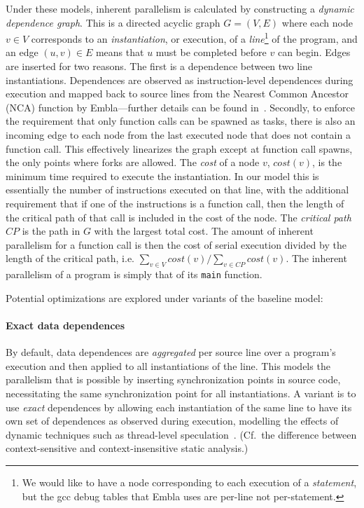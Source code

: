 Under these models, inherent parallelism is calculated by constructing a \emph{dynamic dependence graph}.
This is a directed acyclic graph $G=(V,E)$ where each node $v\in V$ corresponds to an \emph{instantiation},
or execution, of a \emph{line}\footnote{We would like to have a node corresponding to each execution of a \emph{statement}, but the gcc debug tables that Embla uses are per-line not per-statement.} of the program,
and an edge $(u,v)\in E$ means that $u$ must be completed before $v$ can begin.
Edges are inserted for two reasons.
The first is a dependence between two line instantiations.
Dependences are observed as instruction-level dependences during execution and mapped back to source lines from the Nearest Common Ancestor (NCA) function by Embla---further
details can be found in~\cite{embla:08}.
Secondly, to enforce the requirement that only function calls can be spawned as tasks,
there is also an incoming edge to each node from the last executed node that does not contain a function call.
This effectively linearizes the graph except at function call spawns, the only points where forks are allowed.
The \emph{cost} of a node $v$, $\mathit{cost}(v)$,
is the minimum time required to execute the instantiation.
In our model this is essentially the number of instructions executed on that line,
with the additional requirement that if one of the instructions is a function call,
then the length of the critical path of that call is included in the cost of the node.
The \emph{critical path} $\mathit{CP}$ is the path in $G$ with the largest total cost.
The amount of inherent parallelism for a function call is then the cost of serial execution divided by the length of the critical path,
i.e. $\sum_{v\in V} \mathit{cost}(v)/\sum_{v\in \mathit{CP}} \mathit{cost}(v)$.
The inherent parallelism of a program is simply that of its \texttt{main} function.

Potential optimizations are explored under variants of the baseline model:

\paragraph*{Exact data dependences}
By default, data dependences are \emph{aggregated} per source line over a program's execution
and then applied to all instantiations of the line.
This models the parallelism that is possible by inserting synchronization points in source code,
necessitating the same synchronization point for all instantiations.
A variant is to use \emph{exact} dependences by allowing each instantiation of the same line to have its own set of dependences as observed during execution,
modelling the effects of dynamic techniques such as thread-level speculation~\cite{Rundberg01anall-software,gregory05stampede}.
(Cf.\ the difference between context-sensitive and context-insensitive static analysis.)

